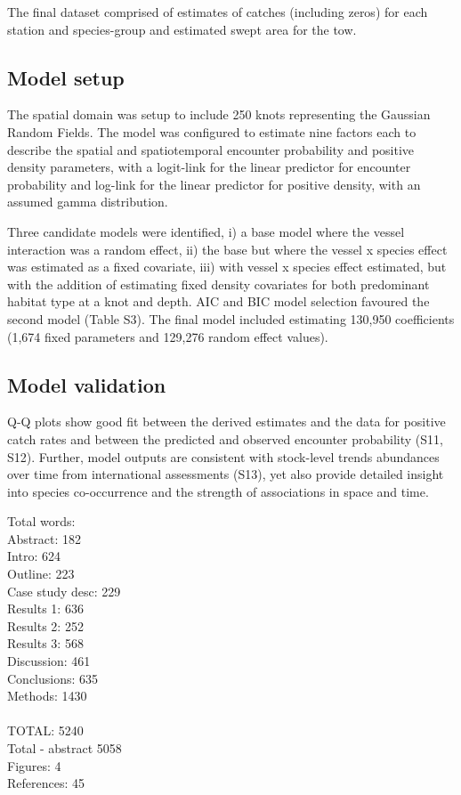 \documentclass{nature}
\begin{document}
\begin{linenumbers}
The final dataset comprised of estimates of catches (including zeros) for each
station and species-group and estimated swept area for the tow.

\subsection{Model setup}

The spatial domain was setup to include 250 knots representing the Gaussian
Random Fields. The model was configured to estimate nine factors each to describe
the spatial and spatiotemporal encounter probability and positive density
parameters, with a logit-link for the linear predictor for encounter
probability and log-link for the linear predictor for positive density, with an
assumed gamma distribution.

Three candidate models were identified, i) a base model where the vessel
interaction was a random effect, ii) the base but where the vessel x species
effect was estimated as a fixed covariate, iii) with vessel x species effect
estimated, but with the addition of estimating fixed density covariates for
both predominant habitat type at a knot and depth. AIC and BIC model selection
favoured the second model (Table S3). The final model included estimating
130,950 coefficients (1,674 fixed parameters and 129,276 random effect values).

\subsection{Model validation}

Q-Q plots show good fit between the derived estimates and the data for positive
catch rates and between the predicted and observed encounter probability (S11,
S12).  Further, model outputs are consistent with stock-level trends abundances
over time from international assessments (S13), yet also provide detailed
insight into species co-occurrence and the strength of associations in space
and time. 

\newpage

Total words: \\
Abstract:	 	  182 \\
Intro:   		  624  \\
Outline:		  223 \\
Case study desc:	  229 \\
Results 1:		  636 \\
Results 2:		  252 \\
Results 3:		  568 \\
Discussion:	          461 \\
Conclusions:	          635  \\
Methods:		  1430 \\
\\
TOTAL:			  5240 \\
Total - abstract          5058 \\

Figures: 4  \\
References: 45 \\

\end{linenumbers}
\end{document}
